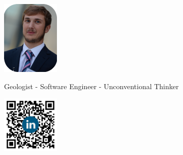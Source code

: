 \documentclass[]{friggeri-cv}
\begin{document}
\begin{figure}[!h]
	\begin{minipage}{0.48\textwidth}
		\begin{flushleft}
			\includegraphics[width=2.75cm]{img/profile.png}
		\end{flushleft}
	\end{minipage}\hfill
	{Geologist - Software Engineer - Unconventional Thinker}
	\begin{minipage}{0.48\textwidth}
		\begin{flushright}
			\includegraphics[width=2.75cm]{img/QR.png}
		\end{flushright}
	\end{minipage}
\end{figure}
\vspace{-0.75cm}
\end{document}
